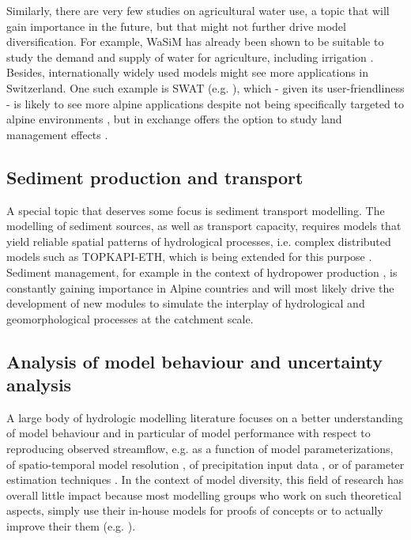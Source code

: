 \documentclass[10pt,a4paper]{article}
\begin{document}
Similarly, there are very few studies on agricultural water use, a topic
that will gain importance in the future, but that might not further
drive model diversification. For example, WaSiM has already been
shown to be suitable to study the demand and supply of water for
agriculture, including irrigation \citep{Fuhrer2012}. Besides,
internationally widely used models might see more applications in
Switzerland. One such example is SWAT (e.g. \citealt{Abbaspour2007} ), which
- given its user-friendliness - is likely to see more alpine
applications despite not being specifically targeted to alpine
environments \citep{Andrianaki2019}, but in exchange offers the option to
study land management effects \citep{Zarrineh2018}.

\subsection{Sediment production and transport}
\label{sec:application:sediment}

A special topic that deserves some focus is sediment transport
modelling. The modelling of sediment sources, as well as transport
capacity, requires models that yield reliable spatial patterns of
hydrological processes, i.e. complex distributed models such as
TOPKAPI-ETH, which is being extended for this
purpose \citep{Konz_2011,Battista2020}. Sediment management, for example in the
context of hydropower production \citep{RaymondPralong2015,Gabbud2015}, is constantly
gaining importance in Alpine countries and will most likely drive the
development of new modules to simulate the interplay of hydrological and
geomorphological processes at the catchment scale.

\subsection{Analysis of model behaviour and uncertainty analysis}
\label{sec:application:uncertainty}

A large body of hydrologic modelling literature focuses on a better
understanding of model behaviour and in particular of model performance
with respect to reproducing observed streamflow, e.g. as a function of
model parameterizations, of spatio-temporal model resolution
\citep{Brunner_2019}, of precipitation input data \citep{Sikorska2016,Muller-Thomy2019}, 
or of parameter estimation techniques \citep{Foglia_2009}. In the
context of model diversity, this field of research has overall little
impact because most modelling groups who work on such theoretical
aspects, simply use their in-house models for proofs of concepts or to
actually improve their them (e.g. \citealt{Schaefli2007,Hingray2010}).
\end{document}
